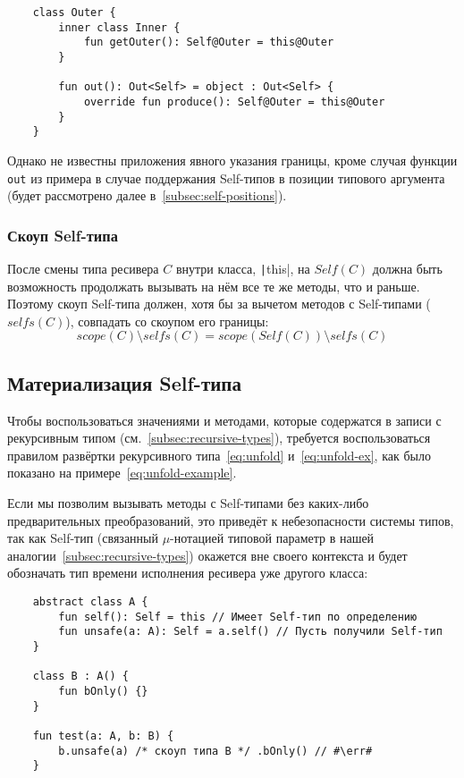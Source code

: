\begin{verbatim}
    class Outer {
        inner class Inner {
            fun getOuter(): Self@Outer = this@Outer
        }

        fun out(): Out<Self> = object : Out<Self> {
            override fun produce(): Self@Outer = this@Outer
        }
    }
\end{verbatim}

Однако не известны приложения явного указания границы, кроме случая функции \texttt{out} из примера в случае поддержания Self-типов в позиции типового аргумента (будет рассмотрено далее в~\ref{subsec:self-positions}).

\subsubsection{Скоуп Self-типа}

После смены типа ресивера $C$ внутри класса, \texttt|this|, на $Self(C)$ должна быть возможность продолжать вызывать на нём все те же методы, что и раньше.
Поэтому скоуп Self-типа должен, хотя бы за вычетом методов с Self-типами ($selfs(C)$), совпадать со скоупом его границы:
\begin{equation*}
    scope(C) \setminus selfs(C) = scope(Self(C)) \setminus selfs(C)
\end{equation*}


\subsection{Материализация Self-типа} \label{subsec:materialization}

Чтобы воспользоваться значениями и методами, которые содержатся в записи с рекурсивным типом (см.~\ref{subsec:recursive-types}), требуется воспользоваться правилом развёртки рекурсивного типа~\eqref{eq:unfold} и~\eqref{eq:unfold-ex}, как было показано на примере~\eqref{eq:unfold-example}.

Если мы позволим вызывать методы с Self-типами без каких-либо предварительных преобразований, это приведёт к небезопасности системы типов, так как Self-тип (связанный $\mu$-нотацией типовой параметр в нашей аналогии~\ref{subsec:recursive-types}) окажется вне своего контекста и будет обозначать тип времени исполнения ресивера уже другого класса:

\begin{verbatim}
    abstract class A {
        fun self(): Self = this // Имеет Self-тип по определению
        fun unsafe(a: A): Self = a.self() // Пусть получили Self-тип
    }

    class B : A() {
        fun bOnly() {}
    }

    fun test(a: A, b: B) {
        b.unsafe(a) /* скоуп типа B */ .bOnly() // #\err#
    }
\end{verbatim}

